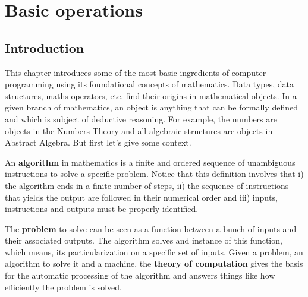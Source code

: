 \chapter{Basic operations} \label{chap:basicop}

    \vspace{-1cm}
    \section{Introduction} 
    \vspace{-0.7cm}
This chapter introduces some of the most basic ingredients of computer programming 
using its foundational concepts of mathematics.
Data types, data structures, maths operators, etc.
find their origins in mathematical objects.
In a given branch of mathematics, an object is anything that can be formally defined and 
which is subject of deductive reasoning. 
For example, the numbers are objects in the Numbers Theory and
all algebraic structures are objects in Abstract Algebra.
But first let's give some context. 

An \textbf{algorithm} in mathematics is a finite and ordered sequence of unambiguous instructions to solve a specific problem. 
Notice that this definition involves that i) the algorithm ends in a finite number of steps, 
ii) the sequence of instructions that yields the output are followed in their numerical order and
iii) inputs, instructions and outputs must be properly identified. 

The \textbf{problem} to solve can be seen as a function between a bunch of inputs and their associated outputs.
The algorithm solves and instance of this function, which means, its particularization on a specific set of inputs.
Given a problem, an algorithm to solve it and a machine, 
the \textbf{theory of computation} gives the basis for the automatic processing of the algorithm
and answers things like how efficiently the problem is solved. 

